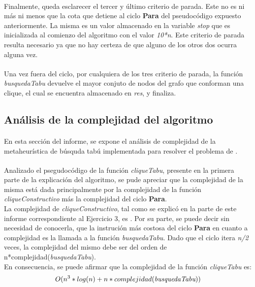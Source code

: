 \paragraph{}
Finalmente, queda esclarecer el tercer y último criterio de parada. Este no es ni más ni menos que la cota que detiene al ciclo \textbf{Para} del pseudocódigo expuesto anteriormente. La misma es un valor almacenado en la variable \textit{stop} que es inicializada al comienzo del algoritmo con el valor \textit{10*n}. Este criterio de parada resulta necesario ya que no hay certeza de que alguno de los otros dos ocurra alguna vez.
 
\paragraph{}
Una vez fuera del ciclo, por cualquiera de los tres criterio de parada, la función \textit{busquedaTabu} devuelve el mayor conjuto de nodos del grafo que conforman una clique, el cual se encuentra almacenado en \textit{res}, y finaliza.

\subsection{Análisis de la complejidad del algoritmo}

\paragraph{}
En esta sección del informe, se expone el análisis de complejidad de la metaheurística de búsquda tabú implementada para resolver el problema de \mc.

\paragraph{}
Analizado el psegudocódigo de la función \textit{cliqueTabu}, presente en la primera parte de la explicación del algoritmo, se pude apreciar que la complejidad de la misma está dada principalmente por la complejidad de la función \textit{cliqueConstructivo} más la complejidad del ciclo \textbf{Para}. \\
La complejidad de \textit{cliqueConstructivo}, tal como se explicó en la parte de este informe correspondiente al Ejercicio 3, es . Por su parte, se puede decir sin necesidad de conocerla, que la instrución más costosa del ciclo \textbf{Para} en cuanto a complejidad es la llamada a la función \textit{busquedaTabu}. Dado que el ciclo itera \textit{n/2} veces, la complejidad del mismo debe ser del orden de n*complejidad(\textit{busquedaTabu}). \\
En consecuencia, se puede afirmar que la complejidad de la función \textit{cliqueTabu} es: $$O(n^3*log(n) + n*complejidad(\textit{busquedaTabu}))$$

